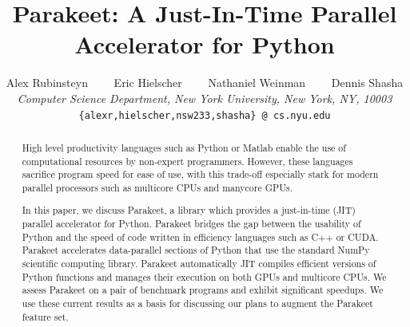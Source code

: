 \documentclass[10pt,twocolumn]{article}
\begin{document}
\title{Parakeet: A Just-In-Time Parallel Accelerator for Python}
\author{
Alex Rubinsteyn \ \ \ \ Eric Hielscher \ \ \ \ Nathaniel Weinman \ \ \ \
Dennis Shasha \\
{\it Computer Science Department, New York University, New York, NY, 10003} \\
\small{\tt \{alexr,hielscher,nsw233,shasha\} @ cs.nyu.edu}
}
\date{}

\newcommand{\WITH}{\impfnt{with}}
\newcommand{\VALUES}{\impfnt{values}}
\newcommand{\MAP}{\impfnt{map}}
\newcommand{\REDUCE}{\impfnt{reduce}}
\newcommand{\ALLPAIRS}{\impfnt{allpairs}}
\newcommand{\CAST}{\impfnt{cast}}
\newcommand{\APPLY}{\impfnt{apply}}
\newcommand{\INDEX}{\impfnt{index}}
\newcommand{\SCAN}{\impfnt{scan}}
\newcommand{\THREADIDX}{\impfnt{threadIdx}}
\newcommand{\BLOCKIDX}{\impfnt{blockIdx}}
\newcommand{\BLOCKDIM}{\impfnt{blockDim}}
\newcommand{\GRIDDIM}{\impfnt{gridDim}}
\newcommand{\VEC}{\impfnt{vec}}
\newcommand{\concat}{\ensuremath{+\!\!\!\!+\,}}

\setlength\fboxsep{8pt}
\setlength\fboxrule{0.5pt}

\maketitle

\begin{abstract}
High level productivity languages such as Python or Matlab enable the use of computational resources by non-expert programmers.  However, these languages sacrifice program speed for ease of use, with this trade-off especially stark for modern parallel processors such as multicore CPUs and manycore GPUs.

In this paper, we discuss Parakeet, a library which provides a just-in-time (JIT) parallel accelerator for Python.  Parakeet bridges the gap between the usability of Python and the speed of code written in efficiency languages such as C++ or CUDA.  Parakeet accelerates data-parallel sections of Python that use the standard NumPy scientific computing library.  Parakeet automatically JIT compiles efficient versions of Python functions and manages their execution on both GPUs and multicore CPUs.  We assess Parakeet on a pair of benchmark programs and exhibit significant speedups.  We use these current results as a basis for discussing our plans to augment the Parakeet feature set.
\end{abstract}
\end{document}
